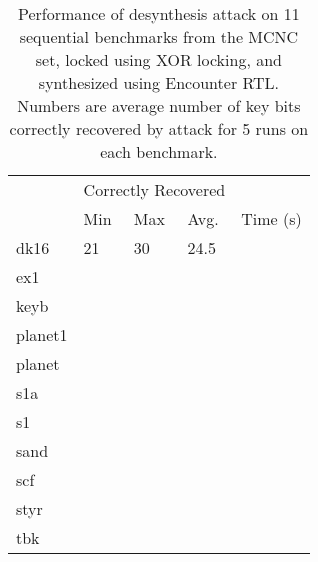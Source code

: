 \begin{table}[ht]
\centering
\caption{Performance of desynthesis attack on 11 sequential benchmarks from the MCNC set, locked using XOR locking, and synthesized using Encounter RTL. Numbers are average number of key bits correctly recovered by attack for 5 runs on each benchmark.}
\label{my-label}
\begin{tabular}{|l|l|l|l|l|}
\hline
                  & \multicolumn{3}{l|}{Correctly Recovered} &          %
                  \\ \cline{2-5} 
                  & Min         & Max         & Avg.         & Time (s) \\ \hline
dk16              &  21         & 30          &     24.5     &      \\ \hline
ex1              &           &           &          &        \\ \hline
keyb             &           &           &          &\\ \hline
planet1             &           &           &          &   \\ \hline
planet             &           &           &          &\\ \hline
s1a             &           &           &          &
\\ \hline
s1             &           &           &           &
\\ \hline
sand             &           &           &          &
\\ \hline
scf             &           &           &          &\\ \hline
styr             &           &           &          &\\ \hline
tbk             &           &           &          &\\ \hline

\end{tabular}
\end{table}


